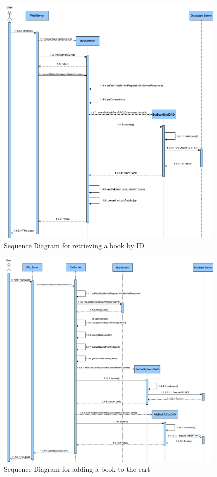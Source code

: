 \clearpage
\begin{figure}[h!]
    \centering
    \includegraphics[width=\textwidth]{photos/SequenceDiagram.png}
    \caption{Sequence Diagram for retrieving a book by ID}
    \label{fig:sequencediagram}
\end{figure}


\clearpage
\begin{figure}[h!]
    \centering
    \includegraphics[width=\textwidth]{photos/SequenceDiagram_CartServlet_AddBookToCart.png}
    \caption{Sequence Diagram for adding a book to the cart}
    \label{fig:addtocartsequencediagram}
\end{figure}
